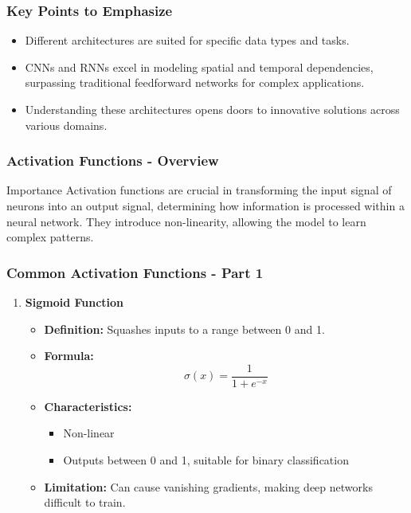 \documentclass[aspectratio=169]{beamer}
\begin{document}
\begin{frame}[fragile]
    \frametitle{Key Points to Emphasize}
    \begin{itemize}
        \item Different architectures are suited for specific data types and tasks.
        \item CNNs and RNNs excel in modeling spatial and temporal dependencies, surpassing traditional feedforward networks for complex applications.
        \item Understanding these architectures opens doors to innovative solutions across various domains.
    \end{itemize}
\end{frame}

\begin{frame}[fragile]
    \frametitle{Activation Functions - Overview}
    \begin{block}{Importance}
        Activation functions are crucial in transforming the input signal of neurons into an output signal, determining how information is processed within a neural network. They introduce non-linearity, allowing the model to learn complex patterns.
    \end{block}
\end{frame}

\begin{frame}[fragile]
    \frametitle{Common Activation Functions - Part 1}
    \begin{enumerate}
        \item \textbf{Sigmoid Function}
        \begin{itemize}
            \item \textbf{Definition:} Squashes inputs to a range between 0 and 1.
            \item \textbf{Formula:} 
            \begin{equation}
                \sigma(x) = \frac{1}{1 + e^{-x}}
            \end{equation}
            \item \textbf{Characteristics:}
            \begin{itemize}
                \item Non-linear
                \item Outputs between 0 and 1, suitable for binary classification
            \end{itemize}
            \item \textbf{Limitation:} Can cause vanishing gradients, making deep networks difficult to train.
        \end{itemize}
    \end{enumerate}
\end{frame}
\end{document}
